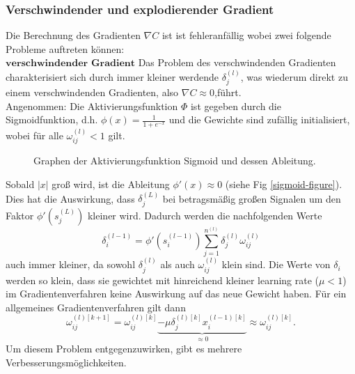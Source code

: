 \subsubsection{Verschwindender und explodierender Gradient}
Die Berechnung des Gradienten $\nabla C$ ist ist fehleranfällig wobei zwei folgende Probleme auftreten können: \\
$\textbf{verschwindender Gradient}$
Das Problem des verschwindenden Gradienten charakterisiert sich durch immer kleiner werdende $\delta_j^{(l)}$, was wiederum
direkt zu einem verschwindenden Gradienten, also $\nabla C \approx 0$,führt. \\
Angenommen: Die Aktivierungsfunktion $\Phi$ ist gegeben durch die Sigmoidfunktion, d.h. $\phi(x) =\frac{1}{1+e^{-x}}$ und
die Gewichte sind zufällig initialisiert, wobei für alle $\omega_{ij}^{(l)}<1$ gilt.\\
\begin{figure}
    \begin{center}
        \caption{Graphen der Aktivierungsfunktion Sigmoid und dessen Ableitung.}
        \label{sigmoid-figure}
    \end{center}
\end{figure}
Sobald $|x|$ groß wird, ist die Ableitung $\phi'(x) \approx 0$ (siehe Fig \eqref{sigmoid-figure}). Dies hat die Auswirkung, dass
$\delta_j^{(L)}$ bei betragsmäßig großen Signalen um den Faktor $\phi'(s_j^{(L)})$ kleiner wird. Dadurch werden die
nachfolgenden Werte
\[
    \delta_i^{(l-1)}=\phi'(s_i^{(l-1)})\sum\limits_{j=1}^{n^{(l)}}\delta_j^{(l)} \omega_{ij}^{(l)}
\]
auch immer kleiner, da sowohl $\delta_j^{(l)}$ als auch $\omega_{ij}^{(l)}$ klein sind. Die Werte von $\delta_i$ werden
so klein, dass sie gewichtet mit hinreichend kleiner learning rate ($\mu <1$) im Gradientenverfahren keine Auswirkung
auf das neue Gewicht haben. Für ein allgemeines Gradientenverfahren gilt dann
\[
    \omega_{ij}^{(l)[k+1]} = \omega_{ij}^{(l)[k]}\underbrace{-\mu \delta_j^{(l)[k]}x_i^{(l-1)[k]}}_{\approx 0}\approx \omega_{ij}^{(l)[k]}.
\]
Um diesem Problem entgegenzuwirken, gibt es mehrere Verbesserungsmöglichkeiten.\newline
